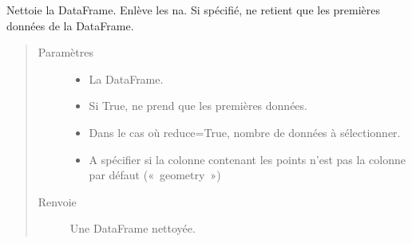 \documentclass[letterpaper,10pt,french]{sphinxmanual}
\begin{document}
\begin{fulllineitems}
\label{\detokenize{index:src.clusterizer.clusterizer.nettoyer}}
\sphinxAtStartPar
Nettoie la DataFrame. Enlève les na.
Si spécifié, ne retient que les premières données de la DataFrame.
\begin{quote}\begin{description}
\item[{Paramètres}] \leavevmode\begin{itemize}
\item {} 
\sphinxAtStartPar
{} \textendash{} La DataFrame.

\item {} 
\sphinxAtStartPar
{} \textendash{} Si True, ne prend que les premières données.

\item {} 
\sphinxAtStartPar
{} \textendash{} Dans le cas où reduce=True, nombre de données à sélectionner.

\item {} 
\sphinxAtStartPar
{} \textendash{} A spécifier si la colonne contenant les points n’est pas la colonne par défaut (« geometry »)

\end{itemize}

\item[{Renvoie}] \leavevmode
\sphinxAtStartPar
Une DataFrame nettoyée.

\end{description}\end{quote}

\end{fulllineitems}

\end{document}
